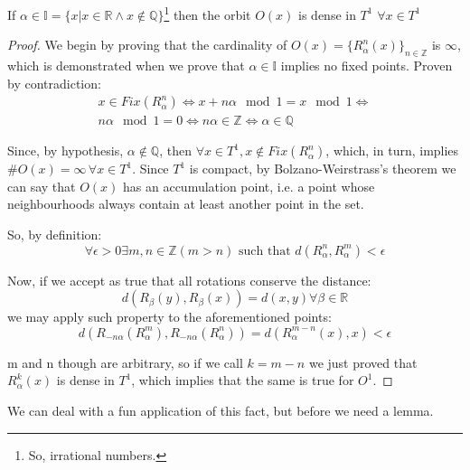 \begin{proposition}
    If $\alpha\in\mathbb{I}=\{x|x\in\mathbb{R} \land x\notin\mathbb{Q}\}$\footnote{So, irrational numbers.} then the orbit $O(x)$ is dense in $T^1$ $\forall x\in T^1$
\end{proposition}
\begin{proof}
    We begin by proving that the cardinality of $O(x)=\{R_{\alpha}^n(x)\}_{n\in\mathbb{Z}}$ is $\infty$, which is demonstrated when we prove that $\alpha \in \mathbb{I}$ implies no fixed points. Proven by contradiction:
    \begin{align*}
        x\in Fix(R^n_{\alpha})\iff x+n\alpha \mod 1=x \mod 1\iff \\
        n\alpha  \mod 1 =0\iff n\alpha\in\mathbb{Z}\iff\alpha\in\mathbb{Q}
    \end{align*}

    Since, by hypothesis, $\alpha\notin\mathbb{Q}$, then $\forall x\in T^1, x\notin Fix(R^n_\alpha)$, which, in turn, implies $\#O(x)=\infty\,\forall x\in T^1$. Since $T^1$ is compact, by Bolzano-Weirstrass's theorem we can say that $O(x)$ has an accumulation point, i.e. a point whose neighbourhoods always contain at least another point in the set. 

    So, by definition:
    \begin{equation*}
        \forall \epsilon>0 \exists m,n\in\mathbb{Z}(m>n) \text{ such that } d(R_{\alpha}^n,R_{\alpha}^m)<\epsilon
    \end{equation*}
    
    Now, if we accept as true that all rotations conserve the distance: \begin{equation*}
        d(R_{\beta}(y), R_{\beta}(x))=d(x,y)\forall\beta\in\mathbb{R}
    \end{equation*}
    we may apply such property to the aforementioned points:
    \begin{equation*}
        d(R_{-n\alpha}(R_{\alpha}^m), R_{-n\alpha}(R_{\alpha}^n))=d(R^{m-n}_{\alpha}(x), x)<\epsilon
    \end{equation*}
    
    m and n though are arbitrary, so if we call $k=m-n$ we just proved that $R^k_{\alpha}(x)$ is dense in $T^1$, which implies that the same is true for $O^1$.
\end{proof}

We can deal with a fun application of this fact, but before we need a lemma.

